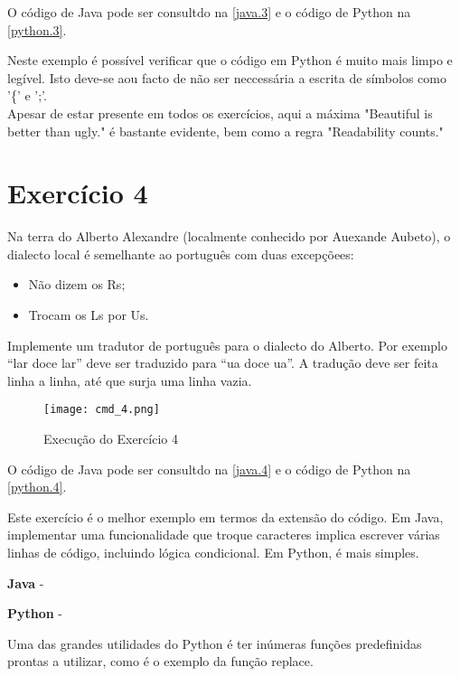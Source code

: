 \documentclass[a4paper]{report}
\begin{document}
O código de Java pode ser consultdo na \autoref{java.3} e o código de Python na \autoref{python.3}.

Neste exemplo é possível verificar que o código em  Python é muito mais limpo e legível.
Isto deve-se aou facto de não ser neccessária a escrita de símbolos como '\{' e ';'.
\\
Apesar de estar presente em todos os exercícios, aqui a máxima "\gls{Beautiful is better than ugly}." é bastante evidente, bem como a regra "\gls{Readability counts}."

\clearpage

\section{Exercício 4}
\label{exercicio4}

Na terra do Alberto Alexandre (localmente conhecido por Auexande Aubeto), o dialecto local é semelhante ao português com duas excepçõees:

\begin{itemize}
\item Não dizem os Rs;
\item Trocam os Ls por Us.
\end{itemize}


Implemente um tradutor de português para o dialecto do Alberto. Por exemplo “lar doce lar” deve ser traduzido para “ua doce ua”. A tradução deve ser feita linha a linha, até que surja uma linha vazia.


\begin{figure}[ht]
 \texttt{[image: cmd\_4.png]}
 \caption{Execução do Exercício 4}
 \label{cmd4}
\end{figure}


O código de Java pode ser consultdo na \autoref{java.4} e o código de Python na \autoref{python.4}.

Este exercício é o melhor exemplo em termos da extensão do código.
Em Java, implementar uma funcionalidade que troque caracteres implica escrever várias linhas de código, incluindo lógica condicional. Em Python, é mais simples.

\begin{description}
    \item \textbf{Java} - 
    \item \textbf{Python} - 
\end{description}

Uma das grandes utilidades do Python é ter inúmeras funções predefinidas prontas a utilizar, como é o exemplo da função replace.
\end{document}
